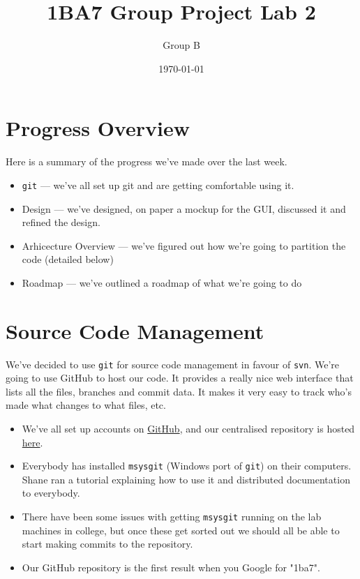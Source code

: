 \documentclass[titlepage,a4paper]{article}
\begin{document}
\title{1BA7 Group Project Lab 2}
\author{Group B}
\date{\today}
\maketitle
\newcommand{\mono}[1]{\texttt{#1}}
\newcommand{\code}[1]{\texttt{#1}}

\section{Progress Overview}
Here is a summary of the progress we've made over the last week.
\begin{itemize}
\item \mono{git} --- we've all set up git and are getting comfortable using it.
\item Design --- we've designed, on paper a mockup for the GUI, discussed it and
refined the design.
\item Arhicecture Overview --- we've figured out how we're going to partition the
code (detailed below)
\item Roadmap --- we've outlined a roadmap of what we're going to do
\end{itemize}

\section{Source Code Management}
We've decided to use \code{git} for source code management in favour of
\code{svn}. We're going to use GitHub to host our code. It provides a really
nice web interface that lists all the files, branches and commit data. It makes
it very easy to track who's made what changes to what files, etc.
\begin{itemize}
\item We've all set up accounts on \href{http://github.com}{GitHub}, and our
centralised repository is hosted \href{http://github.com/1ba7/}{here}.
\item Everybody has installed \code{msysgit} (Windows port of \code{git}) on
their computers. Shane ran a tutorial explaining how to use it and distributed
documentation to everybody.
\item There have been some issues with getting \code{msysgit} running on the
lab machines in college, but once these get sorted out we should all be able to
start making commits to the repository.
\item Our GitHub repository is the first result when you Google for "1ba7".
\end{itemize}
\end{document}
